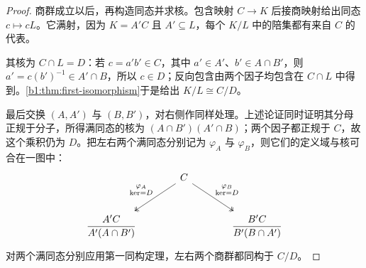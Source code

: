 \begin{proof}
	商群成立以后，再构造同态并求核。包含映射 \(C\to K\) 后接商映射给出同态 \(c\mapsto cL\)。它满射，因为 \(K=A'C\) 且 \(A'\subseteq L\)，每个 \(K/L\) 中的陪集都有来自 \(C\) 的代表。

	其核为 \(C\cap L=D\)：若 \(c=a'b'\in C\)，其中 \(a'\in A'\)、\(b'\in A\cap B'\)，则 \(a'=c(b')^{-1}\in A'\cap B\)，所以 \(c\in D\)；反向包含由两个因子均包含在 \(C\cap L\) 中得到。\cref{b1:thm:first-isomorphism}于是给出 \(K/L\cong C/D\)。

	最后交换 \((A,A')\) 与 \((B,B')\)，对右侧作同样处理。上述论证同时证明其分母正规于分子，所得满同态的核为 \((A\cap B')(A'\cap B)\)；两个因子都正规于 \(C\)，故这个乘积仍为 \(D\)。把左右两个满同态分别记为 \(\varphi_A\) 与 \(\varphi_B\)，则它们的定义域与核可合在一图中：
	\[
		\begin{tikzcd}[row sep=large, column sep=large]
			& C \arrow[dl, two heads, "\substack{\varphi_A\\\ker=D}"'] \arrow[dr, two heads, "\substack{\varphi_B\\\ker=D}"] & \\
			\dfrac{A'C}{A'(A\cap B')} && \dfrac{B'C}{B'(B\cap A')}
		\end{tikzcd}
	\]
	对两个满同态分别应用第一同构定理，左右两个商群都同构于 \(C/D\)。
\end{proof}

